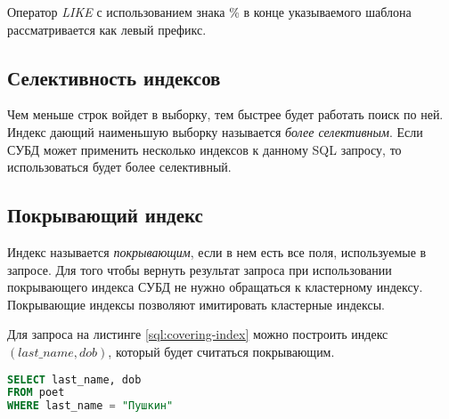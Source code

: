 Оператор \textit{LIKE} с использованием знака \% в конце указываемого шаблона рассматривается как левый префикс.

\subsection{Селективность индексов}

Чем меньше строк войдет в выборку, тем быстрее будет работать поиск по ней. Индекс дающий наименьшую выборку называется \textit{более селективным}. Если СУБД может применить несколько индексов к данному SQL запросу, то использоваться будет более селективный.

\subsection{Покрывающий индекс}
\label{section:covering-index}

Индекс называется \textit{покрывающим}, если в нем есть все поля, используемые в запросе. Для того чтобы вернуть результат запроса при использовании покрывающего индекса СУБД не нужно обращаться к кластерному индексу. Покрывающие индексы позволяют имитировать кластерные индексы. 

Для запроса на листинге \ref{sql:covering-index} можно построить индекс $(last\_name, dob)$, который будет считаться покрывающим.
\begin{lstlisting}[language=sql, label=sql:covering-index, caption={запрос для covering-index}]
SELECT last_name, dob
FROM poet
WHERE last_name = "Пушкин"
\end{lstlisting}
